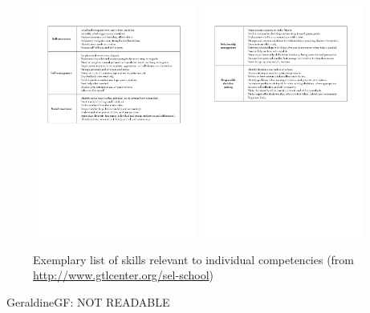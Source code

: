 \documentclass[prodmode,acmtochi]{acmsmall}
\newcommand{\todo}[1]{\textrm{\textrm{\textcolor{LightBlue}{[[#1]]}}}}
\begin{document}
\begin{figure}
  \centering
	\includegraphics[width=0.48\textwidth]{images/skills-list1}
	\includegraphics[width=0.48\textwidth]{images/skills-list2}
	\caption{Exemplary list of skills relevant to individual competencies (from \url{http://www.gtlcenter.org/sel-school})}
	\label{fig:skillsList}
\end{figure}
\ Geraldine{GF: NOT READABLE}

%
%
\end{document}
